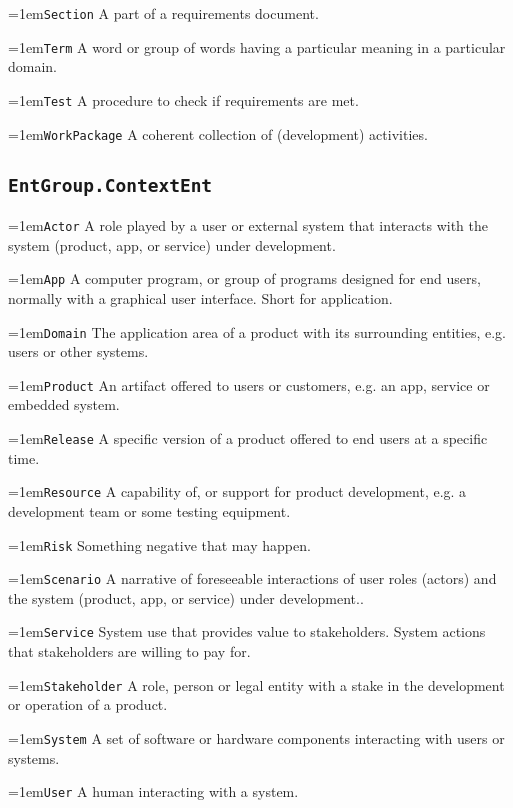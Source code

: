 \documentclass[a4paper,oneside]{article}
\begin{document}
\begin{multicols*}{4}
\hangindent=1em\lstinline+Section+ A part of a requirements document. 

\hangindent=1em\lstinline+Term+ A word or group of words having a particular meaning in a particular domain. 

\hangindent=1em\lstinline+Test+ A procedure to check if requirements are met. 

\hangindent=1em\lstinline+WorkPackage+ A coherent collection of (development) activities. 


\subsection*{\texttt{EntGroup.ContextEnt}}
\hangindent=1em\lstinline+Actor+ A role played by a user or external system that interacts with the system (product, app, or service) under development. 

\hangindent=1em\lstinline+App+ A computer program, or group of programs designed for end users, normally with a graphical user interface. Short for application. 

\hangindent=1em\lstinline+Domain+ The application area of a product with its surrounding entities, e.g. users or other systems. 

\hangindent=1em\lstinline+Product+ An artifact offered to users or customers, e.g. an app, service or  embedded system. 

\hangindent=1em\lstinline+Release+ A specific version of a product offered to end users at a specific time. 

\hangindent=1em\lstinline+Resource+ A capability of, or support for product development, e.g. a development team or some testing equipment. 

\hangindent=1em\lstinline+Risk+ Something negative that may happen. 

\hangindent=1em\lstinline+Scenario+ A narrative of foreseeable interactions of user roles (actors) and the system (product, app, or service) under development.. 

\hangindent=1em\lstinline+Service+ System use that provides value to stakeholders. System actions that stakeholders are willing to pay for. 

\hangindent=1em\lstinline+Stakeholder+ A role, person or legal entity with a stake in the development or operation of a product. 

\hangindent=1em\lstinline+System+ A set of software or hardware components interacting with users or systems. 

\hangindent=1em\lstinline+User+ A human interacting with a system. 



\end{multicols*}
\end{document}
